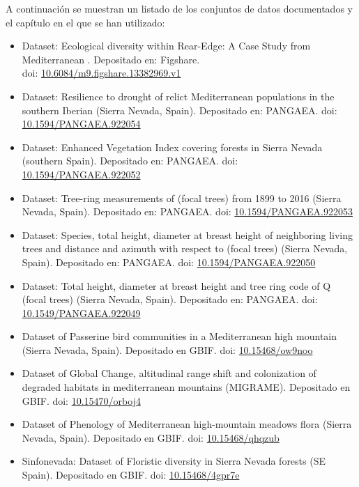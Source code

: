 A continuación se muestran un listado de los conjuntos de datos documentados y el capítulo en el que se han utilizado:

\begin{itemize}
    \item Dataset: Ecological diversity within Rear-Edge: A Case Study from Mediterranean \Qpw. Depositado en: Figshare. \\
    doi: \href{https://doi.org/10.6084/m9.figshare.13382969.v1}{10.6084/m9.figshare.13382969.v1}
    \item Dataset: Resilience to drought of relict Mediterranean \Qpy populations in the southern Iberian (Sierra Nevada, Spain). Depositado en: PANGAEA. doi: \href{https://doi.pangaea.de/10.1594/PANGAEA.922054}{10.1594/PANGAEA.922054}
    \item Dataset: Enhanced Vegetation Index covering \Qpy forests in Sierra Nevada (southern Spain). Depositado en: PANGAEA. doi: \href{https://doi.pangaea.de/10.1594/PANGAEA.922052}{10.1594/PANGAEA.922052}
    \item Dataset: Tree-ring measurements of \Qpy (focal trees) from 1899 to 2016 (Sierra Nevada, Spain). Depositado en: PANGAEA. doi: \href{https://doi.pangaea.de/10.1594/PANGAEA.922053}{10.1594/PANGAEA.922053}
    \item Dataset: Species, total height, diameter at breast height of neighboring living trees and distance and azimuth with respect to \Qpy (focal trees) (Sierra Nevada, Spain). Depositado en: PANGAEA. doi: \href{https://doi.pangaea.de/10.1594/PANGAEA.922050}{10.1594/PANGAEA.922050}
    \item Dataset: Total height, diameter at breast height and tree ring code of Q \Qpy (focal trees) (Sierra Nevada, Spain). Depositado en: PANGAEA. doi: \href{https://doi.pangaea.de/10.1594/PANGAEA.922050}{10.1549/PANGAEA.922049}
    \item Dataset of Passerine bird communities in a Mediterranean high mountain (Sierra Nevada, Spain). Depositado en GBIF. doi: \href{https://doi.org/10.15468/ow9noo}{10.15468/ow9noo}
    \item Dataset of Global Change, altitudinal range shift and colonization of degraded habitats in mediterranean mountains (MIGRAME). Depositado en GBIF. doi: \href{https://doi.org/10.15470/orboj4}{10.15470/orboj4}
    \item Dataset of Phenology of Mediterranean high-mountain meadows flora (Sierra Nevada, Spain). Depositado en GBIF. doi: \href{https://doi.org/10.15468/qhqzub}{10.15468/qhqzub}
    \item Sinfonevada: Dataset of Floristic diversity in Sierra Nevada forests (SE Spain). Depositado en GBIF. doi: \href{https://doi.org/10.15468/4gpr7e}{10.15468/4gpr7e}
\end{itemize}

